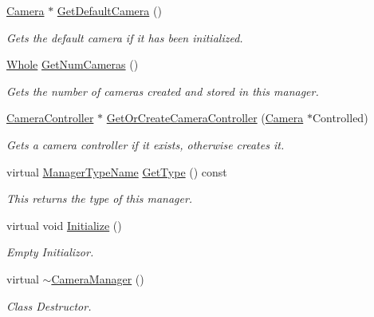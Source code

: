 \begin{DoxyCompactItemize}
\hyperlink{classphys_1_1Camera}{Camera} $\ast$ \hyperlink{classphys_1_1CameraManager_ad7ef5b6a4ca501729c2d5d107d1bf392}{GetDefaultCamera} ()
\begin{DoxyCompactList}\small\item\em Gets the default camera if it has been initialized. \item\end{DoxyCompactList}\item 
\hyperlink{namespacephys_a460f6bc24c8dd347b05e0366ae34f34a}{Whole} \hyperlink{classphys_1_1CameraManager_a1a2111b4868bec403979b354395c4caf}{GetNumCameras} ()
\begin{DoxyCompactList}\small\item\em Gets the number of cameras created and stored in this manager. \item\end{DoxyCompactList}\item 
\hyperlink{classphys_1_1CameraController}{CameraController} $\ast$ \hyperlink{classphys_1_1CameraManager_aaacbf12ce8ff0c8683f326c850166a6e}{GetOrCreateCameraController} (\hyperlink{classphys_1_1Camera}{Camera} $\ast$Controlled)
\begin{DoxyCompactList}\small\item\em Gets a camera controller if it exists, otherwise creates it. \item\end{DoxyCompactList}\item 
virtual \hyperlink{classphys_1_1ManagerBase_aaa6ccddf23892eaccb898529414f80a5}{ManagerTypeName} \hyperlink{classphys_1_1CameraManager_a8412ea634307aa280b615a3cc7c9b739}{GetType} () const 
\begin{DoxyCompactList}\small\item\em This returns the type of this manager. \item\end{DoxyCompactList}\item 
virtual void \hyperlink{classphys_1_1CameraManager_a5e956b61fa341ae576d8d160da518488}{Initialize} ()
\begin{DoxyCompactList}\small\item\em Empty Initializor. \item\end{DoxyCompactList}\item 
virtual \hyperlink{classphys_1_1CameraManager_a0b0f032477309eb47b0302fd5eef198c}{$\sim$CameraManager} ()
\begin{DoxyCompactList}\small\item\em Class Destructor. \item\end{DoxyCompactList}\end{DoxyCompactItemize}
